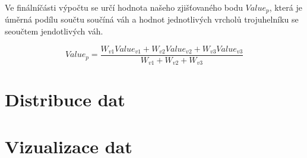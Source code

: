 \documentclass[czech,bachelor,dept460,male,csharp,cpdeclaration]{diploma}
\begin{document}
	Ve finálníčásti výpočtu se určí hodnota našeho zjišťovaného bodu $Value_p$, která je úměrná podílu součtu součíná váh a hodnot jednotlivých vrcholů trojuhelníku se seoučtem jendotlivých váh.
	
	\[Value_p = \frac{W_{v1}Value_{v1} + W_{v2}Value_{v2} + W_{v3}Value_{v3}}{W_{v1} + W_{v2} + W_{v3}} \]
	
	
	\section{Distribuce dat}
	
	\section{Vizualizace dat}
	
\end{document}
